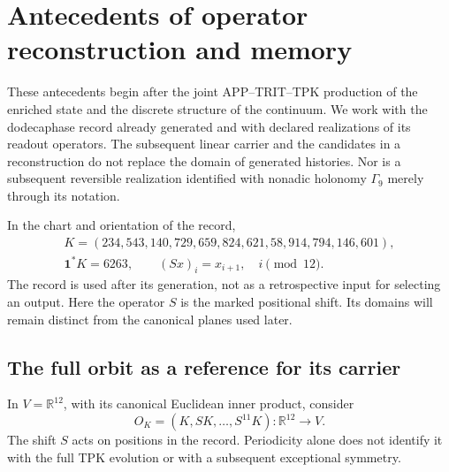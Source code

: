 \section{Antecedents of operator reconstruction and memory}
\label{md:antmem:capitulo}

These antecedents begin after the joint APP--TRIT--TPK production
of the enriched state and the discrete structure of the
continuum. We work with the dodecaphase record already generated and with
declared realizations of its readout operators. The subsequent linear carrier
and the candidates in a reconstruction do not replace the domain of
generated histories. Nor is a subsequent reversible realization
identified with nonadic holonomy \(\Gamma_9\) merely through its notation.

In the chart and orientation of the record,
\begin{equation}
 \begin{gathered}
 K=(234,543,140,729,659,824,621,58,914,794,146,601),\\
 \mathbf1^{*}K=6263,\qquad
 (Sx)_i=x_{i+1},\quad i\pmod {12}.
 \end{gathered}
 \label{md:antmem:registro}
\end{equation}
The record is used after its generation, not as a retrospective input
for selecting an output. Here the operator \(S\) is
the marked positional shift. Its domains will remain
distinct from the canonical planes used later.

\subsection{The full orbit as a reference for its carrier}
\label{md:antmem:k:orbita}

In \(V=\mathbb R^{12}\), with its canonical Euclidean inner product, consider
\[
 O_K=(K,SK,\ldots,S^{11}K):\mathbb R^{12}\longrightarrow V.
\]
The shift \(S\) acts on positions in the record. Periodicity alone
does not identify it with the full TPK evolution or with
a subsequent exceptional symmetry.

